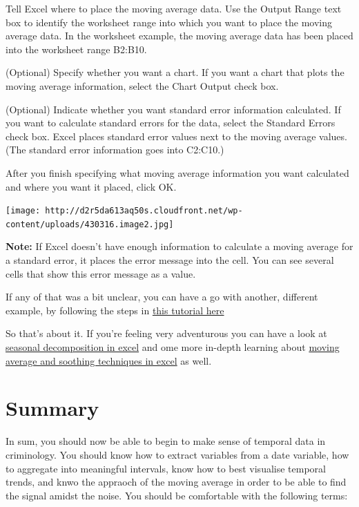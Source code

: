 \documentclass[]{book}
\theoremstyle{definition}
\theoremstyle{definition}
\theoremstyle{definition}
\theoremstyle{remark}
\begin{document}
Tell Excel where to place the moving average data. Use the Output Range
text box to identify the worksheet range into which you want to place
the moving average data. In the worksheet example, the moving average
data has been placed into the worksheet range B2:B10.

(Optional) Specify whether you want a chart. If you want a chart that
plots the moving average information, select the Chart Output check box.

(Optional) Indicate whether you want standard error information
calculated. If you want to calculate standard errors for the data,
select the Standard Errors check box. Excel places standard error values
next to the moving average values. (The standard error information goes
into C2:C10.)

After you finish specifying what moving average information you want
calculated and where you want it placed, click OK.

\texttt{[image: http://d2r5da613aq50s.cloudfront.net/wp-content/uploads/430316.image2.jpg]}

\textbf{Note:} If Excel doesn't have enough information to calculate a
moving average for a standard error, it places the error message into
the cell. You can see several cells that show this error message as a
value.

If any of that was a bit unclear, you can have a go with another,
different example, by following the steps in
\href{http://www.excel-easy.com/examples/moving-average.html}{this
tutorial here}

So that's about it. If you're feeling very adventurous you can have a
look at
\href{https://www.searchlaboratory.com/2013/09/time-series-decomposition-using-excel/}{seasonal
decomposition in excel} and ome more in-depth learning about
\href{http://www.informit.com/articles/article.aspx?p=2433607}{moving
average and soothing techniques in excel} as well.

\hypertarget{summary-6}{%
\section{Summary}\label{summary-6}}

In sum, you should now be able to begin to make sense of temporal data
in criminology. You should know how to extract variables from a date
variable, how to aggregate into meaningful intervals, know how to best
visualise temporal trends, and knwo the appraoch of the moving average
in order to be able to find the signal amidst the noise. You should be
comfortable with the following terms:
\end{document}
